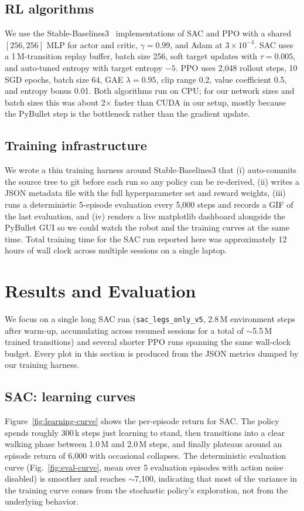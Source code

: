 \documentclass[sigconf,nonacm]{acmart}
\begin{document}
\subsection{RL algorithms}
We use the Stable-Baselines3~\cite{raffin2021sb3} implementations of SAC and
PPO with a shared $[256,256]$ MLP for actor and critic, $\gamma{=}0.99$, and
Adam at $3\!\times\!10^{-4}$. SAC uses a 1\,M-transition replay buffer, batch
size 256, soft target updates with $\tau{=}0.005$, and auto-tuned entropy with
target entropy $-5$. PPO uses 2{,}048 rollout steps, 10 SGD epochs, batch size
64, GAE $\lambda{=}0.95$, clip range 0.2, value coefficient 0.5, and entropy
bonus 0.01. Both algorithms run on CPU; for our network sizes and batch sizes
this was about 2$\times$ faster than CUDA in our setup, mostly because the
PyBullet step is the bottleneck rather than the gradient update.

\subsection{Training infrastructure}
We wrote a thin training harness around Stable-Baselines3 that (i) auto-commits
the source tree to git before each run so any policy can be re-derived,
(ii) writes a JSON metadata file with the full hyperparameter set and reward
weights, (iii) runs a deterministic 5-episode evaluation every 5{,}000 steps and
records a GIF of the last evaluation, and (iv) renders a live matplotlib
dashboard alongside the PyBullet GUI so we could watch the robot and the
training curves at the same time. Total training time for the SAC run reported
here was approximately 12 hours of wall clock across multiple sessions on a
single laptop.

\section{Results and Evaluation}\label{sec:results}
We focus on a single long SAC run (\texttt{sac\_legs\_only\_v5}, 2.8\,M
environment steps after warm-up, accumulating across resumed sessions for a
total of $\sim$5.5\,M trained transitions) and several shorter PPO runs spanning
the same wall-clock budget. Every plot in this section is produced from the
JSON metrics dumped by our training harness.

\subsection{SAC: learning curves}
Figure~\ref{fig:learning-curve} shows the per-episode return for SAC. The
policy spends roughly 300\,k steps just learning to stand, then transitions
into a clear walking phase between 1.0\,M and 2.0\,M steps, and finally
plateaus around an episode return of 6{,}000 with occasional collapses. The
deterministic evaluation curve (Fig.\ \ref{fig:eval-curve}, mean over 5
evaluation episodes with action noise disabled) is smoother and reaches
$\sim$7{,}100, indicating that most of the variance in the training curve
comes from the stochastic policy's exploration, not from the underlying
behavior.
\end{document}

